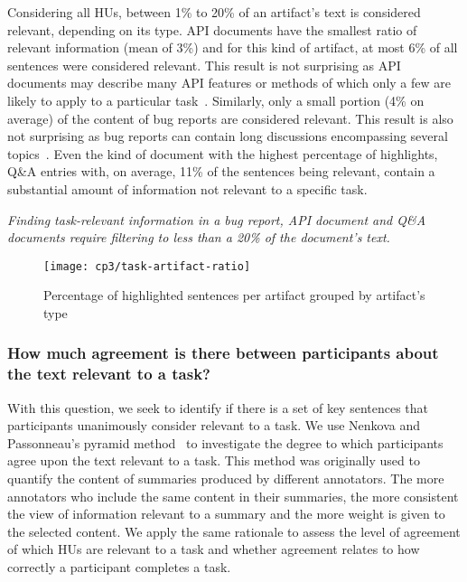 Considering all HUs, between 1\% to 20\% of an artifact's text is considered relevant, depending on its type.
API documents have the smallest ratio of
relevant information (mean of 3\%) and for this kind of artifact,
at most 6\% of all sentences were considered relevant.
This result is not surprising as API documents may describe many API features or
methods of which only a few are likely to apply to
a particular task~\cite{robillard2011field}.
Similarly, only a small portion (4\% on average) of
the content of 
bug reports are considered relevant.
This result is also not
surprising as bug reports can contain long discussions encompassing
several topics~\cite{Breu2010, Rastkar2010}.
Even the kind of document with the highest
percentage of highlights, Q\&A entries with, on average, 11\%
of the sentences being relevant,
contain a substantial amount of information not relevant to a
specific task. 







\medskip
\begin{bluequote}
    \textit{Finding task-relevant information in a bug report,
    API document and Q\&A documents require filtering to less than
    a 20\% of the document's text.}
\end{bluequote}



\begin{figure}
    \centering
    \texttt{[image: cp3/task-artifact-ratio]}
    \caption{Percentage of highlighted sentences per artifact grouped by artifact's type}
    \label{fig:task-artifact-ratio}
\end{figure}

\subsubsection{How much agreement is there between participants about the text relevant to a task?}
\label{cp3:agreement}


With this question, we seek to identify if there is a set of key sentences that
participants unanimously consider relevant to a task. 
We use Nenkova and Passonneau's
pyramid method~\cite{Nenkova2004}
to investigate the degree to which participants agree upon
the text relevant to a task. This method was originally used
to quantify the content of summaries produced by different annotators.
The more annotators who include the same content in their summaries,
the more consistent the view of information relevant to a summary and
the more weight is given to the selected content. We apply the same rationale
to assess the level of agreement of which HUs are relevant to a task
and whether agreement relates to how correctly
a participant completes a task.





